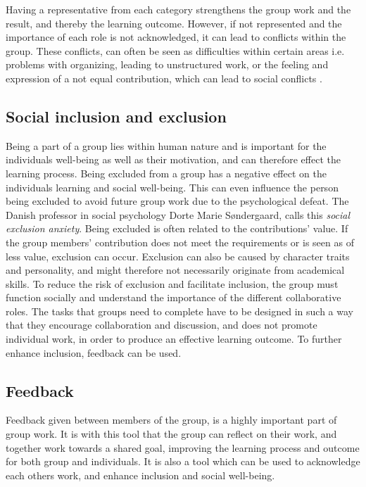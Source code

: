 Having a representative from each category strengthens the group work and the result, and thereby the learning outcome\cite{ProjektarbejdesKompleksitet}. However, if not represented and the importance of each role is not acknowledged, it can lead to conflicts within the group. These conflicts, can often be seen as difficulties within certain areas i.e. problems with organizing, leading to unstructured work, or the feeling and expression of a not equal contribution, which can lead to social conflicts \cite{ProjektarbejdesKompleksitet}. 

\subsection{Social inclusion and exclusion}
Being a part of a group lies within human nature and is important for the individuals well-being as well as their motivation, and can therefore effect the learning process\cite{ProjektarbejdesKompleksitet}. Being excluded from a group has a negative effect on the individuals learning and social well-being. This can even influence the person being excluded to avoid future group work due to the psychological defeat. The Danish professor in social psychology Dorte Marie Søndergaard, calls this \textit{social exclusion anxiety}\cite{ProjektarbejdesKompleksitet}. Being excluded is often related to the contributions' value. If the group members' contribution does not meet the requirements or is seen as of less value, exclusion can occur. Exclusion can also be caused by character traits and personality, and might therefore not necessarily originate from academical skills\cite{ProjektarbejdesKompleksitet}.
To reduce the risk of exclusion and facilitate inclusion, the group must function socially and understand the importance of the different collaborative roles. The tasks that groups need to complete have to be designed in such a way that they encourage collaboration and discussion, and does not promote individual work, in order to produce an effective learning outcome\cite{collaborationSocialPedagogy}. To further enhance inclusion, feedback can be used. 


\subsection{Feedback}
Feedback given between members of the group, is a highly important part of group work\cite{laeringIPraksis}\cite{ProjektarbejdesKompleksitet}. It is with this tool that the group can reflect on their work, and together work towards a shared goal, improving the learning process and outcome for both group and individuals\cite{laeringIPraksis}\cite{ProjektarbejdesKompleksitet}. It is also a tool which can be used to acknowledge each others work, and enhance inclusion and social well-being\cite{laeringIPraksis}\cite{ProjektarbejdesKompleksitet}. 


